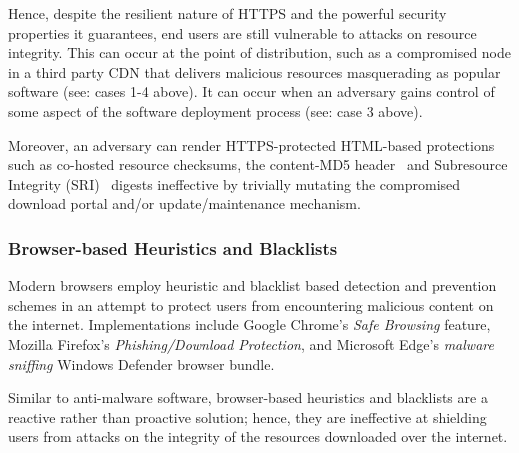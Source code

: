 Hence, despite the resilient nature of HTTPS and the powerful security
properties it guarantees, end users are still vulnerable to attacks on resource
integrity. This can occur at the point of distribution, such as a compromised
node in a third party CDN that delivers malicious resources masquerading as
popular software (see: cases 1-4 above). It can occur when an adversary gains
control of some aspect of the software deployment process (see: case 3 above).

Moreover, an adversary can render HTTPS-protected HTML-based protections such as
co-hosted resource checksums, the content-MD5 header~\cite{MD5Header} and
Subresource Integrity (SRI)~\cite{SRI} digests ineffective by trivially mutating
the compromised download portal and/or update/maintenance mechanism.

\subsubsection{Browser-based Heuristics and Blacklists}

Modern browsers employ heuristic and blacklist based detection and prevention
schemes in an attempt to protect users from encountering malicious content on
the internet. Implementations include Google Chrome's \textit{Safe Browsing}
feature, Mozilla Firefox's \textit{Phishing/Download Protection}, and Microsoft
Edge's \textit{malware sniffing} Windows Defender browser bundle.

Similar to anti-malware software, browser-based heuristics and blacklists are a
reactive rather than proactive solution; hence, they are ineffective at
shielding users from attacks on the integrity of the resources downloaded over
the internet.


